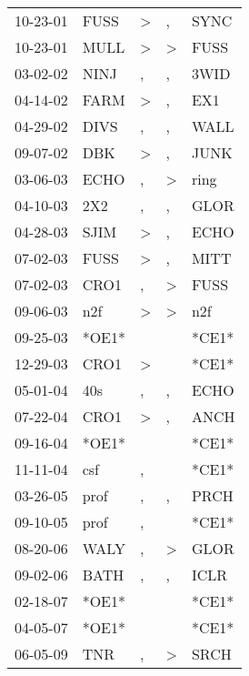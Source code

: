 \begin{supertabular}{lllll}
 10-23-01 &   FUSS &     \textgreater &             , &   SYNC \\
 10-23-01 &   MULL &     \textgreater &  \textgreater &   FUSS \\
 03-02-02 &   NINJ &                , &             , &   3WID \\
 04-14-02 &   FARM &     \textgreater &             , &    EX1 \\
 04-29-02 &   DIVS &                , &             , &   WALL \\
 09-07-02 &    DBK &     \textgreater &             , &   JUNK \\
 03-06-03 &   ECHO &                , &  \textgreater &   ring \\
 04-10-03 &    2X2 &                , &             , &   GLOR \\
 04-28-03 &   SJIM &     \textgreater &             , &   ECHO \\
 07-02-03 &   FUSS &     \textgreater &             , &   MITT \\
 07-02-03 &   CRO1 &                , &  \textgreater &   FUSS \\
 09-06-03 &    n2f &     \textgreater &  \textgreater &    n2f \\
 09-25-03 &  *OE1* &                  &               &  *CE1* \\
 12-29-03 &   CRO1 &     \textgreater &               &  *CE1* \\
 05-01-04 &    40s &                , &             , &   ECHO \\
 07-22-04 &   CRO1 &     \textgreater &             , &   ANCH \\
 09-16-04 &  *OE1* &                  &               &  *CE1* \\
 11-11-04 &    csf &                , &               &  *CE1* \\
 03-26-05 &   prof &                , &             , &   PRCH \\
 09-10-05 &   prof &                , &               &  *CE1* \\
 08-20-06 &   WALY &                , &  \textgreater &   GLOR \\
 09-02-06 &   BATH &                , &             , &   ICLR \\
 02-18-07 &  *OE1* &                  &               &  *CE1* \\
 04-05-07 &  *OE1* &                  &               &  *CE1* \\
 06-05-09 &    TNR &                , &  \textgreater &   SRCH \\

\end{supertabular}
